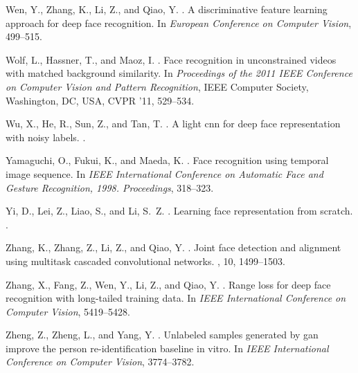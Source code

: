 \documentclass[conference]{acmsiggraph}
\begin{document}
\begin{thebibliography}{\protect{}1998}
{\sc Wen, Y., Zhang, K., Li, Z., and Qiao, Y.}
.
\newblock A discriminative feature learning approach for deep face recognition.
\newblock In {\em European Conference on Computer Vision}, 499--515.

{\sc Wolf, L., Hassner, T., and Maoz, I.}
.
\newblock Face recognition in unconstrained videos with matched background
  similarity.
\newblock In {\em Proceedings of the 2011 IEEE Conference on Computer Vision
  and Pattern Recognition}, IEEE Computer Society, Washington, DC, USA, CVPR
  '11, 529--534.

{\sc Wu, X., He, R., Sun, Z., and Tan, T.}
.
\newblock A light cnn for deep face representation with noisy labels.
.

{\sc Yamaguchi, O., Fukui, K., and Maeda, K.}
.
\newblock Face recognition using temporal image sequence.
\newblock In {\em IEEE International Conference on Automatic Face and Gesture
  Recognition, 1998. Proceedings}, 318--323.

{\sc Yi, D., Lei, Z., Liao, S., and Li, S.~Z.}
.
\newblock Learning face representation from scratch.
.

{\sc Zhang, K., Zhang, Z., Li, Z., and Qiao, Y.}
.
\newblock Joint face detection and alignment using multitask cascaded
  convolutional networks.
, 10, 1499--1503.

{\sc Zhang, X., Fang, Z., Wen, Y., Li, Z., and Qiao, Y.}
.
\newblock Range loss for deep face recognition with long-tailed training data.
\newblock In {\em IEEE International Conference on Computer Vision},
  5419--5428.

{\sc Zheng, Z., Zheng, L., and Yang, Y.}
.
\newblock Unlabeled samples generated by gan improve the person
  re-identification baseline in vitro.
\newblock In {\em IEEE International Conference on Computer Vision},
  3774--3782.

\end{thebibliography}
 
\end{document}
